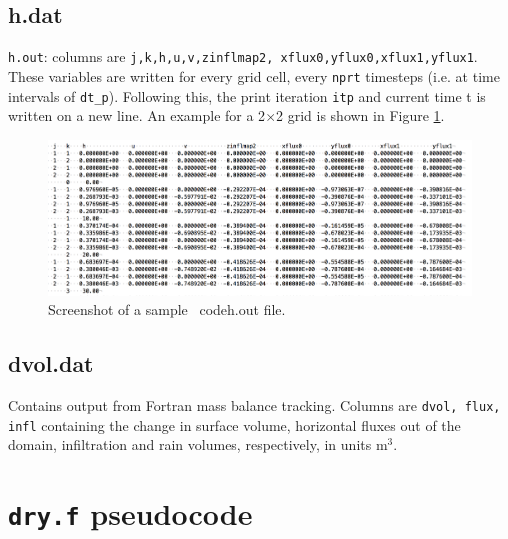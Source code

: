 \documentclass{article}
\newcommand{\code}[1]{\texttt{#1}}
\begin{document}
\subsection{h.dat}

\code{h.out}: columns are \code{j,k,h,u,v,zinflmap2, xflux0,yflux0,xflux1,yflux1}. 
These variables are written for every grid cell, every \code{nprt} timesteps (i.e. at time intervals of \code{dt\_p}). Following this, the print iteration \code{itp} and current time {t} is written on a new line. An example for a 2$\times$2 grid is shown in Figure \ref{h.out_example}.  

 \begin{figure}[h]
 \centering
\includegraphics[width=35pc]{grid/h_out.png}
 \caption{Screenshot of a sample \	code{h.out} file.}
 \label{h.out_example}
 \end{figure}
  
  


\subsection{dvol.dat}

Contains output from Fortran mass balance tracking.
Columns are \code{dvol, flux, infl} containing the  change in surface volume, horizontal fluxes out of the domain, infiltration and rain volumes, respectively, in units m$^3$.






\section{\code{dry.f} pseudocode}
\end{document}
